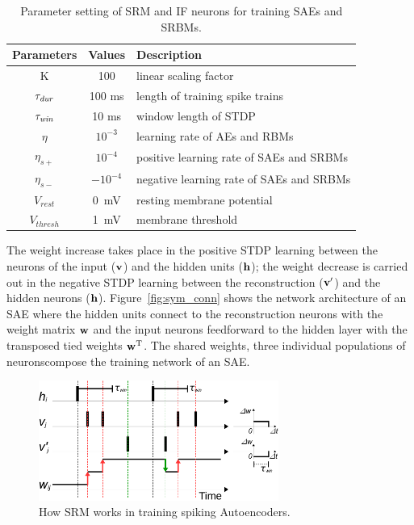 \begin{table}[th]
	\centering
	\caption{\label{tbl:srm}Parameter setting of SRM and IF neurons for training SAEs and SRBMs.}
	\bgroup
	\def\arraystretch{1.2}
	\begin{tabular}{c c l}
		Parameters & Values & Description \\
		\hline
		K & 100 & linear scaling factor\\
		$\tau_{\textit{\textrm{dur}}}$ & 100 ms &  length of training spike trains\\
		$\tau_{\textit{\textrm{win}}}$ & 10 ms & window length of STDP\\
		$\eta$ & $10^{-3}$ & learning rate of AEs and RBMs\\
		$\eta_{s+}$ & $10^{-4}$ & positive learning rate of SAEs and SRBMs\\
		$\eta_{s-}$ & $-10^{-4}$ & negative learning rate of SAEs and SRBMs\\
		$V_{rest}$ & 0~mV & resting membrane potential\\
		$V_{thresh}$ & 1~mV & membrane threshold  \\
	\end{tabular}
	\egroup
\end{table}


The weight increase takes place in the positive STDP learning between the neurons of the input ($\bf{v}$) and the hidden units ($\bf{h}$); 
the weight decrease is carried out in the negative STDP learning between the reconstruction ($\bf{v'}$) and the hidden neurons ($\bf{h}$).
Figure~\ref{fig:sym_conn} shows the network architecture of an SAE where the hidden units connect to the reconstruction neurons with the weight matrix $\bf{w}$ and the input neurons feedforward to the hidden layer with the transposed tied weights $\bf{w}^\textrm{T}$.
The shared weights, \DIFaddbegin {}\DIFaddend three individual populations of neurons\DIFaddbegin \DIFadd{, }\DIFaddend compose the training network of an SAE.

\begin{figure}[th]
	\centering
	\includegraphics[width=0.7\textwidth]{pics_sdlm/rSTDP.pdf}
	\caption{How SRM works in training spiking Autoencoders.}
	\label{fig:rSTDP}
\end{figure}

